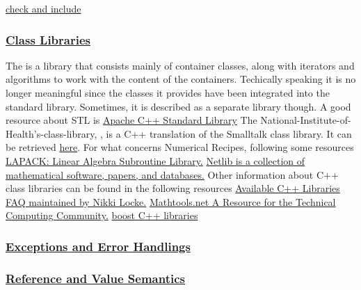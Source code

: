 \href{https://isocpp.org/wiki/faq/containers#slow-containers}{check and include}


\subsubsection{\href{https://isocpp.org/wiki/faq/class-libraries}{Class Libraries}}
The  is a library that consists mainly of container 
classes, along with iterators and algorithms to work with the content 
of the containers. Techically speaking it is no longer meaningful since 
the classes it provides have been integrated into the standard library. 
Sometimes, it is described as a separate library though.
\newline
A good resource about STL is
\newline
\href{http://stdcxx.apache.org/doc/stdlibug/index.html}{Apache C++ Standard Library} 
\newline
The National-Institute-of-Health's-class-library, , is 
a C++ translation of the Smalltalk class library. It can be retrieved 
\href{128.231.128.7/pub/NIHCL/nihcl-3.0.tar.Z}{here}.
\newline
For what concerns Numerical Recipes, following some resources
\newline
\href{http://www.siam.org/}{LAPACK: Linear Algebra Subroutine Library.}
\newline
\href{https://www.netlib.org/}{Netlib is a collection of mathematical software, papers, and databases.}
\newline
Other information about C++ class libraries can be found in the following 
resources
\newline
\href{http://www.trumphurst.com/cpplibs/cpplibs.php}{Available C++ Libraries FAQ maintained by Nikki Locke.}
\newline
\href{http://www.mathtools.net/}{Mathtools.net A Resource for the Technical Computing Community.}
\newline
\href{https://www.boost.org/}{boost C++ libraries}
\newline

\subsubsection{\href{https://isocpp.org/wiki/faq/exceptions}{Exceptions and Error Handlings}}

\subsubsection{\href{https://isocpp.org/wiki/faq/value-vs-ref-semantics}{Reference and Value Semantics}}

